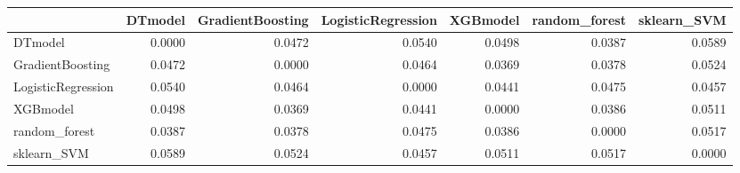 \begin{tabular}{lrrrrrr}
\toprule
 & DTmodel & GradientBoosting & LogisticRegression & XGBmodel & random_forest & sklearn_SVM \\
\midrule
DTmodel & 0.0000 & 0.0472 & 0.0540 & 0.0498 & 0.0387 & 0.0589 \\
GradientBoosting & 0.0472 & 0.0000 & 0.0464 & 0.0369 & 0.0378 & 0.0524 \\
LogisticRegression & 0.0540 & 0.0464 & 0.0000 & 0.0441 & 0.0475 & 0.0457 \\
XGBmodel & 0.0498 & 0.0369 & 0.0441 & 0.0000 & 0.0386 & 0.0511 \\
random_forest & 0.0387 & 0.0378 & 0.0475 & 0.0386 & 0.0000 & 0.0517 \\
sklearn_SVM & 0.0589 & 0.0524 & 0.0457 & 0.0511 & 0.0517 & 0.0000 \\
\bottomrule
\end{tabular}
